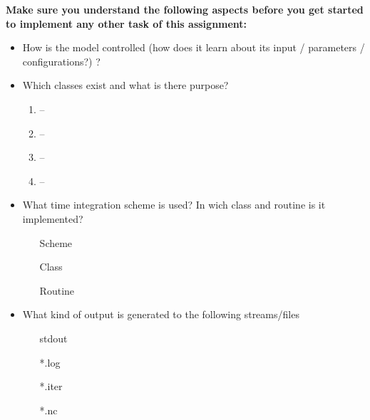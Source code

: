 \documentclass[jobname=project, 10pt]{article}
\begin{document}
\noindent\textbf{Make sure you understand the following aspects before you get started to implement any other task of this assignment:}
\begin{itemize}
\item How is the model controlled (how does it learn about its input / parameters / configurations?) ?
\item Which classes exist and what is there purpose?
  \begin{enumerate}
    \setlength{\itemsep}{1.5em}
  \item \underline{\phantom{CFQGCFQGCFQGCFQG}} -- \underline{\phantom{CFQGCFQGCFQGCFQG}}
  \item \underline{\phantom{CFQGCFQGCFQGCFQG}} -- \underline{\phantom{CFQGCFQGCFQGCFQG}}
  \item \underline{\phantom{CFQGCFQGCFQGCFQG}} -- \underline{\phantom{CFQGCFQGCFQGCFQG}}
  \item \underline{\phantom{CFQGCFQGCFQGCFQG}} -- \underline{\phantom{CFQGCFQGCFQGCFQG}}
  \end{enumerate}
\item What time integration scheme is used? In wich class and routine is it implemented? 
  \begin{itemize} 
    \setlength{\itemsep}{1.5em}
  \item[Scheme] \underline{\hspace{6cm}}
  \item[Class]  \underline{\hspace{6cm}}
  \item[Routine] \underline{\hspace{6cm}}
  \end{itemize}
    
\item What kind of output is generated to the following streams/files 
  \begin{itemize}
    \setlength{\itemsep}{1.5em}

  \item[stdout] \underline{\hspace{6cm}}
  \item[*.log] \underline{\hspace{6cm}} 
  \item[*.iter] \underline{\hspace{6cm}}
  \item[*.nc] \underline{\hspace{6cm}} 
  \end{itemize}

\end{itemize} 
\end{document}
